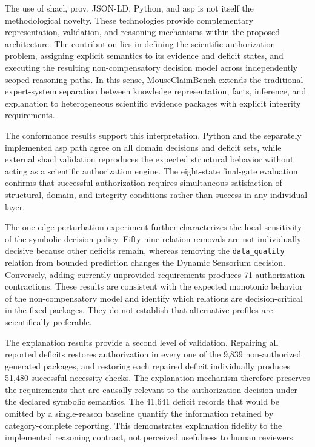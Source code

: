 \documentclass[11pt,a4paper]{article}
\begin{document}
The use of \ac{shacl}, \ac{prov}, JSON-LD, Python, and \ac{asp} is not itself
the methodological novelty. These technologies provide complementary
representation, validation, and reasoning mechanisms within the proposed
architecture. The contribution lies in defining the scientific authorization
problem, assigning explicit semantics to its evidence and deficit states, and
executing the resulting non-compensatory decision model across independently
scoped reasoning paths. In this sense, MouseClaimBench extends the traditional
expert-system separation between knowledge representation, facts, inference,
and explanation to heterogeneous scientific evidence packages with explicit
integrity requirements.

The conformance results support this interpretation. Python and the
separately implemented \ac{asp} path agree on all domain decisions and
deficit sets, while external \ac{shacl} validation reproduces the expected
structural behavior without acting as a scientific authorization engine.
The eight-state final-gate evaluation confirms that successful authorization
requires simultaneous satisfaction of structural, domain, and integrity
conditions rather than success in any individual layer.

The one-edge perturbation experiment further characterizes the local
sensitivity of the symbolic decision policy. Fifty-nine relation removals are
not individually decisive because other deficits remain, whereas removing the
\texttt{data\_quality} relation from bounded prediction changes the Dynamic
Sensorium decision. Conversely, adding currently unprovided requirements
produces 71 authorization contractions. These results are consistent with the
expected monotonic behavior of the non-compensatory model and identify which
relations are decision-critical in the fixed packages. They do not establish
that alternative profiles are scientifically preferable.

The explanation results provide a second level of validation. Repairing all
reported deficits restores authorization in every one of the 9,839
non-authorized generated packages, and restoring each repaired deficit
individually produces 51,480 successful necessity checks. The explanation
mechanism therefore preserves the requirements that are causally relevant to
the authorization decision under the declared symbolic semantics. The
41,641 deficit records that would be omitted by a single-reason baseline
quantify the information retained by category-complete reporting. This
demonstrates explanation fidelity to the implemented reasoning contract, not
perceived usefulness to human reviewers.
\end{document}
